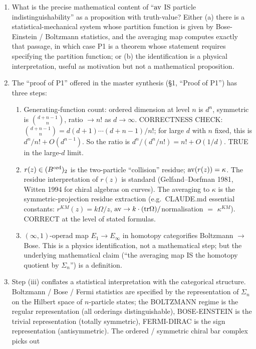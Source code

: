 \begin{enumerate}
\item[Q13.] What is the precise mathematical content of ``$\mathrm{av}$ IS
particle indistinguishability'' as a proposition with truth-value?
Either (a) there is a statistical-mechanical system whose partition
function is given by Bose-Einstein / Boltzmann statistics, and the
averaging map computes exactly that passage, in which case P1 is a
theorem whose statement requires specifying the partition function; or
(b) the identification is a physical interpretation, useful as
motivation but not a mathematical proposition.
\item[Q14.] The ``proof of P1'' offered in the master synthesis
(§1, ``Proof of P1'') has three steps:
\begin{enumerate}
\item[(i)] Generating-function count: ordered dimension at level $n$ is
$d^n$, symmetric is $\binom{d + n - 1}{n}$, ratio $\to n!$ as
$d \to \infty$. CORRECTNESS CHECK: $\binom{d+n-1}{n} = d(d+1) \cdots
(d+n-1)/n!$; for large $d$ with $n$ fixed, this is $d^n/n! + O(d^{n-1})$.
So the ratio is $d^n / (d^n/n!) = n! + O(1/d)$. TRUE in the large-$d$
limit.
\item[(ii)] $r(z) \in (B^{\mathrm{ord}})_2$ is the two-particle ``collision''
residue; $\mathrm{av}(r(z)) = \kappa$. The residue interpretation of $r(z)$ is
standard (Gelfand--Dorfman 1981, Witten 1994 for chiral algebras on
curves). The averaging to $\kappa$ is the
symmetric-projection residue extraction (e.g.\ CLAUDE.md essential
constants: $r^{KM}(z) = k \Omega/z$, $\mathrm{av} \to k \cdot (\mathrm{tr}
\Omega)/$normalisation $= $ $\kappa^{KM}$). CORRECT at the level of
stated formulas.
\item[(iii)] $(\infty,1)$-operad map $E_1 \to E_\infty$ in homotopy
categorifies Boltzmann $\to$ Bose. This is a physics identification,
not a mathematical step; but the underlying mathematical claim
(``the averaging map IS the homotopy quotient by $\Sigma_n$'') is a
definition.
\end{enumerate}
\item[Q15.] Step (iii) conflates a statistical interpretation with the
categorical structure. Boltzmann / Bose / Fermi statistics are specified
by the representation of $\Sigma_n$ on the Hilbert space of $n$-particle
states; the BOLTZMANN regime is the regular representation (all
orderings distinguishable), BOSE-EINSTEIN is the trivial representation
(totally symmetric), FERMI-DIRAC is the sign representation
(antisymmetric). The ordered / symmetric chiral bar complex picks out

\end{enumerate}
